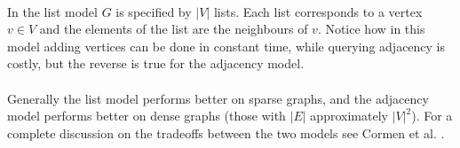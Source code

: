 \paragraph{}
In the list model $G$ is specified by $|V|$ lists. Each list corresponds to a vertex $v \in V$ and the elements of the list are the neighbours of $v$. Notice how in this model adding vertices can be done in constant time, while querying adjacency is costly, but the reverse is true for the adjacency model.
\paragraph{}
Generally the list model performs better on sparse graphs, and the adjacency model performs better on dense graphs (those with $|E|$ approximately $|V|^2$). For a complete discussion on the tradeoffs between the two models see Cormen et al. \cite[pages 529-530]{cormen2009introduction}.